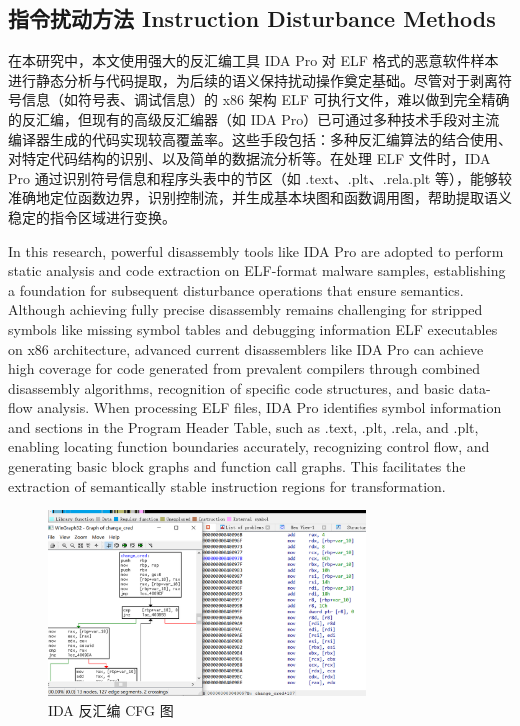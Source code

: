\subsection{指令扰动方法 Instruction Disturbance Methods}

在本研究中，本文使用强大的反汇编工具 IDA Pro 对 ELF 格式的恶意软件样本进行静态分析与代码提取，为后续的语义保持扰动操作奠定基础。尽管对于剥离符号信息（如符号表、调试信息）的 x86 架构 ELF 可执行文件，难以做到完全精确的反汇编，但现有的高级反汇编器（如 IDA Pro）已可通过多种技术手段对主流编译器生成的代码实现较高覆盖率。这些手段包括：多种反汇编算法的结合使用、对特定代码结构的识别、以及简单的数据流分析等。在处理 ELF 文件时，IDA Pro 通过识别符号信息和程序头表中的节区（如 .text、.plt、.rela.plt 等），能够较准确地定位函数边界，识别控制流，并生成基本块图和函数调用图，帮助提取语义稳定的指令区域进行变换。

In this research, powerful disassembly tools like IDA Pro are adopted to perform static analysis and code extraction on ELF-format malware samples, establishing a foundation for subsequent disturbance operations that ensure semantics. Although achieving fully precise disassembly remains challenging for stripped symbols like missing symbol tables and debugging information ELF executables on x86 architecture, advanced current disassemblers like IDA Pro can achieve high coverage for code generated from prevalent compilers through combined disassembly algorithms, recognition of specific code structures, and basic data-flow analysis. When processing ELF files, IDA Pro identifies symbol information and sections in the Program Header Table, such as .text, .plt, .rela, and .plt, enabling locating function boundaries accurately, recognizing control flow, and generating basic block graphs and function call graphs. This facilitates the extraction of semantically stable instruction regions for transformation.

\begin{figure}[hbt]
	\centering
	\includegraphics[width=0.75\textwidth]{figures/4.1}
	\caption{IDA 反汇编 CFG 图}\label{fig:4.1}
\end{figure}


